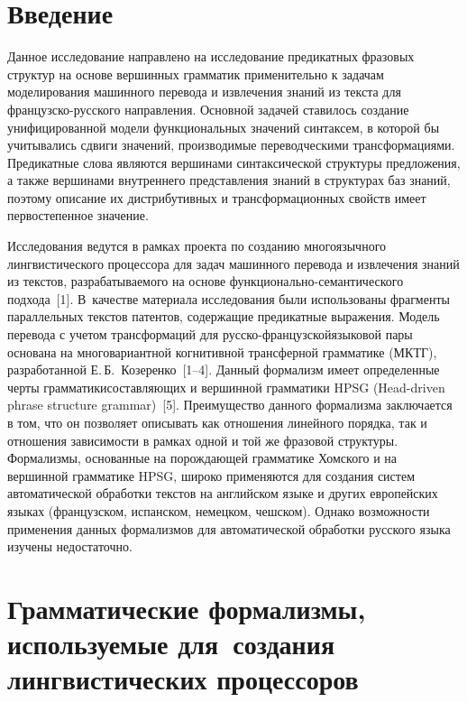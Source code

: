       \begin{multicols}{2}
      
            \label{st\stat}

\section{Введение}

Данное исследование направлено на исследование предикатных фразовых 
структур на основе вершинных грамматик применительно к задачам 
моделирования машинного перевода и извлечения знаний из текста для 
французско-русского на\-прав\-ле\-ния. Основной задачей ставилось создание 
унифицированной модели функциональных значений синтаксем, в которой 
бы учитывались сдвиги значений, производимые переводческими 
трансформациями. Предикатные слова являются вершинами синтаксической 
структуры предложения, а также вершинами внутреннего представления 
знаний в структурах баз знаний, поэтому описание их дистрибутивных и 
трансформационных свойств имеет первостепенное значение.

Исследования ведутся в рамках проекта по созданию многоязычного 
лингвистического процессора для задач машинного перевода и извлечения 
знаний из текстов, разрабатываемого на основе 
функ\-ци\-о\-наль\-но-се\-ман\-ти\-че\-ско\-го подхода~[1]. В~качестве 
материала исследования были использованы фрагменты параллельных 
текстов патентов, содержащие предикатные выражения. Модель перевода с 
учетом трансформаций для рус\-ско-фран\-цуз\-ской\linebreak языковой пары основана 
на многовариантной когнитивной трансферной грамматике (МКТГ), 
разработанной Е.\,Б.~Козеренко~[1--4]. Данный формализм имеет 
определенные черты грамматики\linebreak составляющих и вершинной грамматики 
HPSG (Head-driven phrase structure grammar)~[5]. 
Преимущество данного формализма заключается в том, что он 
позволяет описывать как отношения линейного порядка, так и отношения 
зависимости в рамках одной и той же фразовой структуры. Формализмы, 
основанные на порождающей грамматике Хомского и на вершинной 
грамматике HPSG, широко применяются для создания сис\-тем 
автоматической обработки текстов на английском языке и других 
европейских языках (французском, испанском, немецком, чешском). Однако 
возможности применения данных формализмов для автоматической 
обработки русского языка изучены недостаточно. 
     
\section{Грамматические формализмы, используемые для~создания 
лингвистических процессоров}
      

\end{multicols}
